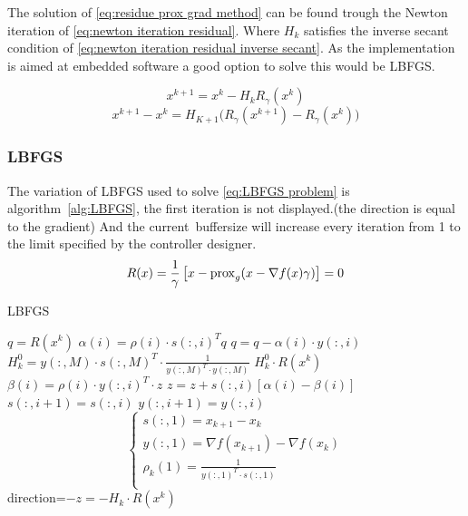 			The solution of \eqref{eq:residue prox grad method} can be found trough the Newton iteration of \eqref{eq:newton iteration residual}. Where $H_k$ satisfies the inverse secant condition of \eqref{eq:newton iteration residual inverse secant}. As the implementation is aimed at embedded software a good option to solve this would be LBFGS.
			
			\begin{equation}
			x^{k+1} = x^k -H_kR_{\gamma}(x^k)
			\label{eq:newton iteration residual}
			\end{equation}
			\begin{equation}
			x^{k+1} - x^k = H_{K+1} \Big( R_{\gamma}(x^{k+1})- R_{\gamma}(x^k) \Big)
			\label{eq:newton iteration residual inverse secant}
			\end{equation}
		\subsubsection{LBFGS}
			The variation of LBFGS used to solve \eqref{eq:LBFGS problem} is algorithm~\ref{alg:LBFGS}, the first iteration is not displayed.(the direction is equal to the gradient) And the current\ buffersize will increase every iteration from 1 to the limit specified by the controller designer.
			\begin{equation}
				R(x) = \frac{1}{\gamma}\left[ x - \operatorname{prox}_g( x - \nabla f(x)\gamma) \right] = 0
				\label{eq:LBFGS problem}
			\end{equation}
			\begin{algorithm}
				\caption{LBFGS}
				\label{alg:LBFGS}
				\begin{algorithmic}[1]
					\State $q = R(x^k)$
						\State $\alpha(i)=\rho(i) \cdot s(:,i)^Tq$
						\State $q = q - \alpha(i) \cdot y(:,i)$
					\EndFor
					\State $H_k^0 = y(:,M) \cdot s(:,M)^T \cdot  \frac{1}{y(:,M)^T \cdot y(:,M)}$
					\State $H^0_k \cdot R(x^k)$
						\State $\beta(i) = \rho(i) \cdot y(:,i)^T \cdot z$
						\State $z = z + s(:,i)[\alpha(i)-\beta(i)]$
					\EndFor
						\State $s(:,i+1)=s(:,i)$
						\State $y(:,i+1)=y(:,i)$
					\EndFor
					\State $$\begin{cases}
								s(:,1) = x_{k+1} - x_k \\
								y(:,1) = \nabla f(x_{k+1}) - \nabla f(x_k)\\
								\rho_k(1) = \frac{1}{y(:,1)^T \cdot s(:,1)} \\ 
							\end{cases}
							$$
					\State \Return direction=$-z=-H_k \cdot R(x^k)$
					\EndProcedure
				\end{algorithmic}
			\end{algorithm}
		
